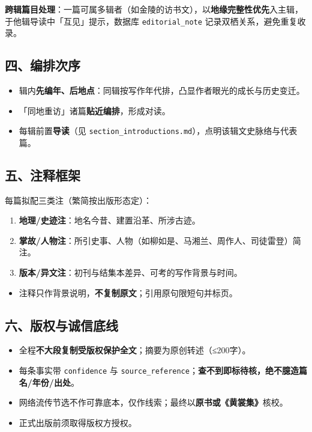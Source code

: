 \documentclass[UTF8,fontset=none,zihao=-4,a4paper]{ctexart}
\begin{document}
\textbf{跨辑篇目处理}：一篇可属多辑者（如金陵的访书文），以\textbf{地缘完整性优先}入主辑，于他辑导读中「互见」提示，数据库 \texttt{editorial\_note} 记录双栖关系，避免重复收录。


\subsection{四、编排次序}


\begin{itemize}
\item 辑内\textbf{先编年、后地点}：同辑按写作年代排，凸显作者眼光的成长与历史变迁。
\item 「同地重访」诸篇\textbf{贴近编排}，形成对读。
\item 每辑前置\textbf{导读}（见 \texttt{section\_introductions.md}），点明该辑文史脉络与代表篇。
\end{itemize}


\subsection{五、注释框架}


每篇拟配三类注（繁简按出版形态定）：

\begin{enumerate}
\item \textbf{地理/史迹注}：地名今昔、建置沿革、所涉古迹。
\item \textbf{掌故/人物注}：所引史事、人物（如柳如是、马湘兰、周作人、司徒雷登）简注。
\item \textbf{版本/异文注}：初刊与结集本差异、可考的写作背景与时间。
\end{enumerate}
\begin{itemize}
\item 注释只作背景说明，\textbf{不复制原文}；引用原句限短句并标页。
\end{itemize}


\subsection{六、版权与诚信底线}


\begin{itemize}
\item 全程\textbf{不大段复制受版权保护全文}；摘要为原创转述（≤200字）。
\item 每条事实带 \texttt{confidence} 与 \texttt{source\_reference}；\textbf{查不到即标待核，绝不臆造篇名/年份/出处}。
\item 网络流传节选不作可靠底本，仅作线索；最终以\textbf{原书或《黄裳集》}核校。
\item 正式出版前须取得版权方授权。
\end{itemize}
\end{document}
